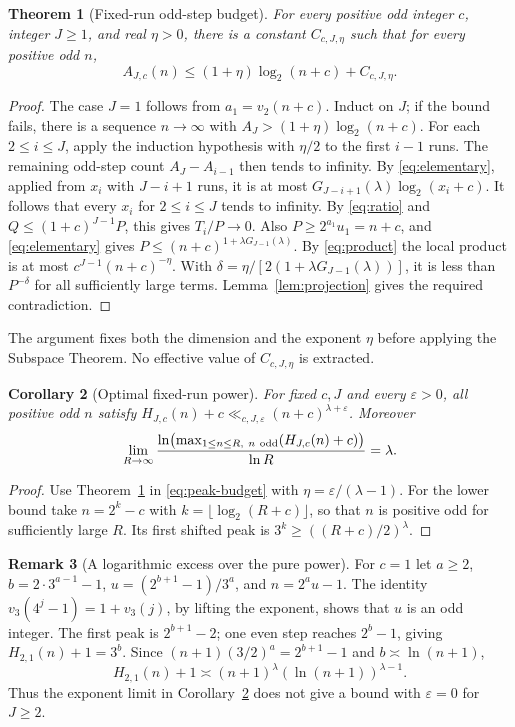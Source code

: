 \documentclass[11pt]{article}
\newtheorem{theorem}{Theorem}[section]
\newtheorem{corollary}[theorem]{Corollary}
\theoremstyle{definition}
\newtheorem{remark}[theorem]{Remark}
\begin{document}
\begin{theorem}[Fixed-run odd-step budget]\label{thm:budget}
For every positive odd integer \(c\), integer \(J\ge1\), and real
\(\eta>0\), there is a constant \(C_{c,J,\eta}\) such that for every
positive odd \(n\),
\[
 A_{J,c}(n)\le(1+\eta)\log_2(n+c)+C_{c,J,\eta}.
\]
\end{theorem}

\begin{proof}
The case \(J=1\) follows from \(a_1=v_2(n+c)\). Induct on \(J\);
if the bound fails, there is a sequence \(n\to\infty\) with
\(A_J>(1+\eta)\log_2(n+c)\). For each \(2\le i\le J\), apply
the induction hypothesis with \(\eta/2\) to the first \(i-1\)
runs. The remaining odd-step count \(A_J-A_{i-1}\) then tends to
infinity. By \eqref{eq:elementary}, applied from \(x_i\) with
\(J-i+1\) runs, it is at most
\(G_{J-i+1}(\lambda)\log_2(x_i+c)\). It follows that every
\(x_i\) for \(2\le i\le J\) tends to infinity.
By \eqref{eq:ratio} and \(Q\le(1+c)^{J-1}P\), this gives
\(T_i/P\to0\). Also \(P\ge2^{a_1}u_1=n+c\), and
\eqref{eq:elementary} gives \(P\le(n+c)^{1+\lambda G_{J-1}(\lambda)}\).
By \eqref{eq:product} the local product is at most
\(c^{J-1}(n+c)^{-\eta}\). With
\(\delta=\eta/[2(1+\lambda G_{J-1}(\lambda))]\), it is less than
\(P^{-\delta}\) for all sufficiently large terms. Lemma~\ref{lem:projection}
gives the required contradiction.
\end{proof}

The argument fixes both the dimension and the exponent \(\eta\)
before applying the Subspace Theorem. No effective value of
\(C_{c,J,\eta}\) is extracted.

\begin{corollary}[Optimal fixed-run power]\label{cor:height}
For fixed \(c,J\) and every \(\varepsilon>0\), all positive odd \(n\)
satisfy \(H_{J,c}(n)+c\ll_{c,J,\varepsilon}(n+c)^{\lambda+\varepsilon}\).
Moreover
\[
 \lim_{R\to\infty}
 \frac{\ln\bigl(\max_{1\le n\le R,\ n\ {\rm odd}}(H_{J,c}(n)+c)\bigr)}
      {\ln R}=\lambda.
\]
\end{corollary}

\begin{proof}
Use Theorem~\ref{thm:budget} in \eqref{eq:peak-budget} with
\(\eta=\varepsilon/(\lambda-1)\). For the lower bound take
\(n=2^k-c\) with \(k=\lfloor\log_2(R+c)\rfloor\), so that \(n\) is
positive odd for sufficiently large \(R\). Its first shifted peak
is \(3^k\ge((R+c)/2)^\lambda\).
\end{proof}

\begin{remark}[A logarithmic excess over the pure power]\label{rem:excess}
For \(c=1\) let \(a\ge2\), \(b=2\cdot3^{a-1}-1\),
\(u=(2^{b+1}-1)/3^a\), and \(n=2^a u-1\).
The identity \(v_3(4^j-1)=1+v_3(j)\), by lifting the exponent,
shows that \(u\) is an odd integer. The first peak is \(2^{b+1}-2\);
one even step reaches \(2^b-1\), giving \(H_{2,1}(n)+1=3^b\).
Since \((n+1)(3/2)^a=2^{b+1}-1\) and \(b\asymp\ln(n+1)\),
\[
 H_{2,1}(n)+1\asymp (n+1)^\lambda(\ln(n+1))^{\lambda-1}.
\]
Thus the exponent limit in Corollary~\ref{cor:height} does not
give a bound with \(\varepsilon=0\) for \(J\ge2\).
\end{remark}
\end{document}
